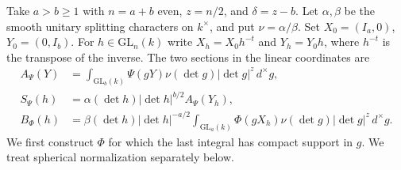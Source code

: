 \documentclass[a4paper,11pt]{article}
\theoremstyle{definition}
\theoremstyle{remark}
\numberwithin{equation}{section}
\begin{document}
Take \(a>b\ge1\) with \(n=a+b\) even, \(z=n/2\), and
\(\delta=z-b\). Let \(\alpha,\beta\) be the smooth unitary splitting
characters on \(k^\times\), and put \(\nu=\alpha/\beta\).
Set \(X_0=(I_a,0)\), \(Y_0=(0,I_b)\). For \(h\in\mathrm{GL}_n(k)\)
write \(X_h=X_0h^{-t}\) and \(Y_h=Y_0h\), where \(h^{-t}\) is the
transpose of the inverse. The two sections in the linear coordinates are
\[
\begin{aligned}
 A_\Psi(Y)&=\int_{\mathrm{GL}_b(k)}\Psi(gY)\nu(\det g)|\det g|^z\,d^\times g,\\
 S_\Psi(h)&=\alpha(\det h)|\det h|^{b/2} A_\Psi(Y_h),\\
 B_\Phi(h)&=\beta(\det h)|\det h|^{-a/2}
     \int_{\mathrm{GL}_a(k)}\Phi(gX_h)\nu(\det g)|\det g|^z\,d^\times g.
\end{aligned}
\]
We first construct \(\Phi\) for which the last integral has compact
support in \(g\). We treat spherical normalization separately below.
\end{document}
